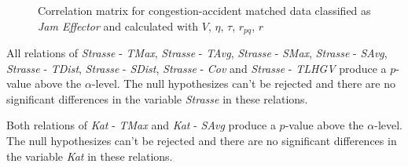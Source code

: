\begin{figure}[!ht]
	\centering
	\caption{Correlation matrix for congestion-accident matched data classified as \textit{Jam Effector} and calculated with $V$, $\eta$, $\tau$, $r_{pq}$, $r$}
	\label{img:correlation_matrix_selected_effector_cramers}
\end{figure}

All relations of \textit{Strasse} - \textit{TMax}, \textit{Strasse} - \textit{TAvg}, \textit{Strasse} - \textit{SMax}, \textit{Strasse} - \textit{SAvg}, \textit{Strasse} - \textit{TDist}, \textit{Strasse} - \textit{SDist}, \textit{Strasse} - \textit{Cov} and \textit{Strasse} - \textit{TLHGV} produce a $p$-value above the $\alpha$-level. The null hypothesizes can't be rejected and there are no significant differences in the variable \textit{Strasse} in these relations.

Both relations of \textit{Kat} - \textit{TMax} and \textit{Kat} - \textit{SAvg} produce a $p$-value above the $\alpha$-level. The null hypothesizes can't be rejected and there are no significant differences in the variable \textit{Kat} in these relations.

